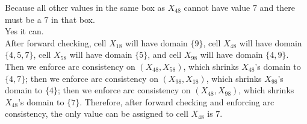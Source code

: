 \documentclass[11pt]{article}
\begin{document}
\begin{onehalfspace}
\begin{itemize}
	Because all other values in the same box as $X_{48}$ cannot have value $7$ and there must be a $7$ in that box.\\
	Yes it can.\\
	After forward checking, cell $X_{18}$ will have domain $\{9\}$, cell $X_{48}$ will have domain $\{4,5,7\}$, cell $X_{58}$ will have domain $\{5\}$, and cell $X_{98}$ will have domain $\{4,9\}$. Then we enforce arc consistency on $(X_{48},X_{58})$, which shrinks $X_{48}$'s domain to $\{4,7\}$; then we enforce arc consistency on $(X_{98},X_{18})$, which shrinks $X_{98}$'s domain to $\{4\}$; then we enforce arc consistency on $(X_{48},X_{98})$, which shrinks $X_{48}$'s domain to $\{7\}$. Therefore, after forward checking and enforcing arc consistency, the only value can be assigned to cell $X_{48}$ is $7$.
\end{itemize}

\end{onehalfspace}
\end{document}
